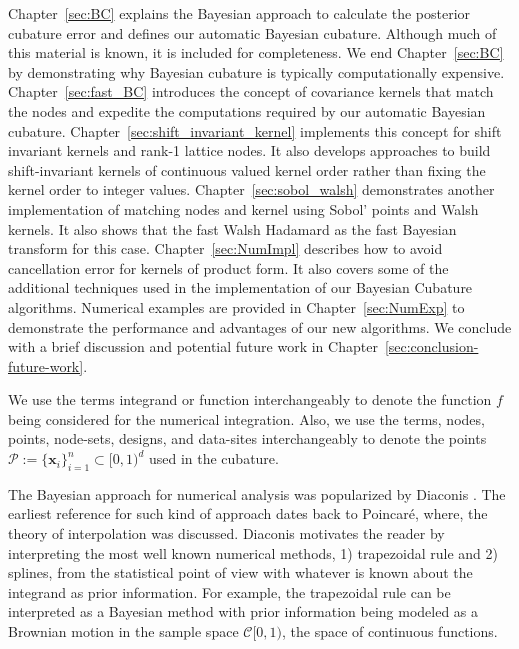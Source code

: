 \documentclass{iitthesis}          %
\newcommand{\bm}[1]{\boldsymbol{#1}}
\newcommand{\vx}{\bm{x}}
\newcommand{\JRNote}[1]{}
\begin{document}
Chapter~\ref{sec:BC} explains the Bayesian approach to calculate the posterior cubature error and defines our automatic Bayesian cubature. Although much of this material is known, it is included for completeness.  We end Chapter~\ref{sec:BC}  by demonstrating why Bayesian cubature is typically computationally expensive.
Chapter~\ref{sec:fast_BC}  introduces the concept of covariance kernels that match the nodes and expedite the computations required by our automatic Bayesian cubature. 
Chapter~\ref{sec:shift_invariant_kernel} implements this concept for shift invariant kernels and rank-1 lattice nodes. It also develops approaches to build shift-invariant kernels of continuous valued kernel order rather than fixing the kernel order to integer values.
Chapter~\ref{sec:sobol_walsh} demonstrates another implementation of matching nodes and kernel using Sobol' points and Walsh kernels. It also shows that the fast Walsh Hadamard as the fast Bayesian transform for this case.
Chapter~\ref{sec:NumImpl} describes how to avoid cancellation error for kernels of product form. 
It also covers  some of the additional techniques used in the implementation of our Bayesian Cubature algorithms. 
Numerical examples are provided in Chapter~\ref{sec:NumExp} to demonstrate the performance and advantages of our new algorithms.  We conclude with a brief discussion and potential future work in Chapter~\ref{sec:conclusion-future-work}.


We use the terms integrand or function interchangeably to denote the function $f$ being considered for the numerical integration. Also, we use the terms, nodes, points, node-sets, designs, and data-sites interchangeably to denote the points $\mathcal{P} := \{\vx_i\}_{i=1}^n \subset [0,1)^d$ used in the cubature.













\label{sec:BC} 


The Bayesian approach for numerical analysis was popularized by Diaconis \cite{Dia88a}. The earliest reference for such kind of approach dates back to Poincar\'e, where, the theory of interpolation was discussed.
Diaconis motivates the reader by interpreting the most well known numerical methods, 1) trapezoidal rule and 2) splines, from the statistical point of view with whatever is known about the integrand as prior information. 
For example, the trapezoidal rule can be interpreted as a Bayesian method with prior information being modeled as a Brownian motion in the sample space $\mathcal{C}[0,1)$, the space of continuous functions. %
\end{document}
